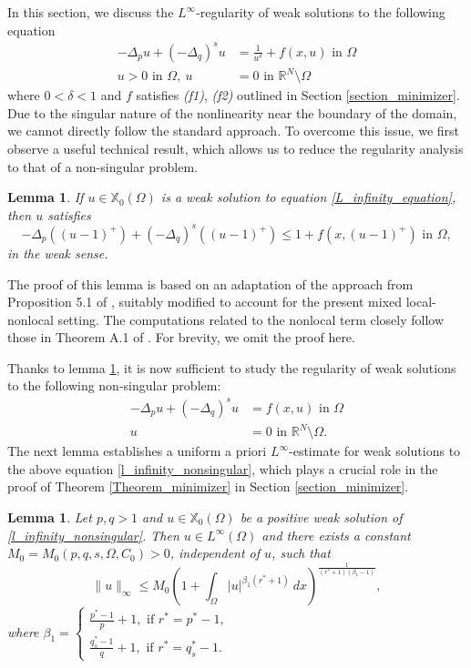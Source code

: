 \documentclass[reqno,oneside]{amsart}
\newtheorem{lemma}[theorem]{Lemma}
\theoremstyle{definition}
\theoremstyle{remark}
\numberwithin{equation}{section}
\newcommand{\Om} {\Omega}
\newcommand{\p}{\Delta_p}
\newcommand{\qs}{(-\Delta_q)^s}
\newcommand{\bdry}{\mathbb{R}^N \setminus \Omega}
\newcommand{\xo}{\mathbb{X}_0}
\begin{document}
In this section, we discuss the $L^{\infty}$-regularity of weak solutions to the following equation
\begin{equation}\label{L_infinity_equation}
    \begin{aligned}
        -\p u + \qs u &= \frac{1}{u^{\delta}} + f(x,u) \text{ in } \Om\\
        u>0 \text{ in } \Om,\ u &= 0 \text{ in } \bdry
    \end{aligned}
\end{equation}
where $0<\delta<1$ and $f$ satisfies \textit{(f1)}, \textit{(f2)} outlined in Section \ref{section_minimizer}. Due to the singular nature of the nonlinearity near the boundary of the domain, we cannot directly follow the standard approach. To overcome this issue, we first observe a useful technical result, which allows us to reduce the regularity analysis to that of a non-singular problem.

\begin{lemma}\label{regularity_lemma}
   If $u\in\xo (\Om)$ is a weak solution to equation \eqref{L_infinity_equation}, then $u$ satisfies
    \[-\p \left((u-1)^+ \right) + \qs \left((u-1)^+ \right) \leq 1 + f\left(x,(u-1)^+ \right) \text{ in } \Om,\]
    in the weak sense.
\end{lemma}

The proof of this lemma is based on an adaptation of the approach from Proposition 5.1 of \cite{giacomoni2019verysingular}, suitably modified to account for the present mixed local-nonlocal setting. The computations related to the nonlocal term closely follow those in Theorem A.1 of \cite{garain2022mixed}. For brevity, we omit the proof here.

Thanks to lemma \ref{regularity_lemma}, it is now sufficient to study the regularity of weak solutions to the following non-singular problem:
\begin{equation}\label{l_infinity_nonsingular}
    \begin{aligned}
        -\p u + \qs u &= f(x,u) \text{ in } \Om\\
        u &=0 \text{ in } \bdry.
    \end{aligned}
\end{equation}
The next lemma establishes a uniform a priori $L^{\infty}$-estimate for weak solutions to the above equation \eqref{l_infinity_nonsingular}, which plays a crucial role in the proof of Theorem \ref{Theorem_minimizer} in Section \ref{section_minimizer}.

\begin{lemma}\label{l_infinity}
    Let $p,q >1$ and $u\in \xo (\Om)$ be a positive weak solution of \eqref{l_infinity_nonsingular}. Then $u\in L^{\infty}(\Om)$ and there exists a constant $M_0 = M_0(p, q,s,\Om,C_0)>0$, independent of $u$, such that
    \[ \|u\|_{\infty} \leq M_0 \left(1+\int_{\Om}|u|^{\beta_1 (r^* +1)}\ dx \right)^{\frac{1}{(r^* +1) (\beta_1 -1)}}, \]
    where $\displaystyle \beta_1 = \begin{cases}
        \frac{p^* -1}{p}+1, \text{ if } r^* = p^* -1,\\[2mm]
        \frac{q_s^* -1}{q}+1, \text{ if } r^* = q_s^* -1.
    \end{cases}$
\end{lemma}
\end{document}
